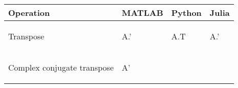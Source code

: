 \documentclass[10pt, landscape]{article}
\newenvironment{Shaded}{}{}
\newcommand{\NormalTok}[1]{{#1}}
\begin{document}
\begin{multicols}{2}
\begin{tabular}[ ]{@{}llll@{}}
\toprule
\begin{minipage}[b]{0.24\columnwidth}\raggedright\strut
Operation\strut
\end{minipage} & \begin{minipage}[b]{0.23\columnwidth}\raggedright\strut
MATLAB\strut
\end{minipage} & \begin{minipage}[b]{0.20\columnwidth}\raggedright\strut
Python\strut
\end{minipage} & \begin{minipage}[b]{0.20\columnwidth}\raggedright\strut
Julia\strut
\end{minipage}\tabularnewline
\midrule
\begin{minipage}[t]{0.24\columnwidth}\raggedright\strut
Transpose\strut
\end{minipage} & \begin{minipage}[t]{0.23\columnwidth}\raggedright\strut
\begin{Shaded}
\begin{Highlighting}[]
\NormalTok{A.'}
\end{Highlighting}
\end{Shaded}
\strut
\end{minipage} & \begin{minipage}[t]{0.20\columnwidth}\raggedright\strut
\begin{Shaded}
\begin{Highlighting}[]
\NormalTok{A.T}
\end{Highlighting}
\end{Shaded}
\strut
\end{minipage} & \begin{minipage}[t]{0.20\columnwidth}\raggedright\strut
\begin{Shaded}
\begin{Highlighting}[]
\NormalTok{A.'}
\end{Highlighting}
\end{Shaded}
\strut
\end{minipage}\tabularnewline
\begin{minipage}[t]{0.24\columnwidth}\raggedright\strut
Complex conjugate transpose\strut
\end{minipage} & \begin{minipage}[t]{0.23\columnwidth}\raggedright\strut
\begin{Shaded}
\begin{Highlighting}[]
\NormalTok{A'}
\end{Highlighting}

\end{Shaded}
\end{minipage}
\end{tabular}
\end{multicols}
\end{document}
